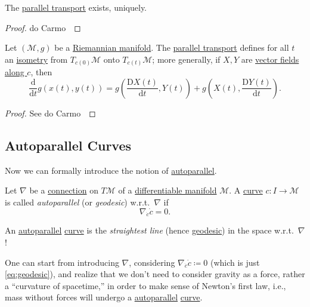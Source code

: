 \begin{proposition}
	The \hyperref[def:parallel-transport]{parallel transport} exists, uniquely.
\end{proposition}
\begin{proof}
	do Carmo~\cite[Proposition 2.6]{flaherty2013riemannian}
\end{proof}

\begin{proposition}
	Let \((\mathcal{M} , g)\) be a \hyperref[def:Riemannian-manifold]{Riemannian manifold}. The \hyperref[def:parallel-transport]{parallel transport} defines for all \(t\) an \hyperref[def:isometry]{isometry} from \(T_{c(0)} \mathcal{M} \) onto \(T_{c(t)} \mathcal{M} \); more generally, if \(X, Y\) are \hyperref[def:vector-field-along-curve]{vector fields along \(c\)}, then
	\[
		\frac{\mathrm{d}}{\mathrm{d}t} g(x(t), y(t))
		= g\left( \frac{\mathrm{D} X(t)}{\mathrm{d} t}, Y(t)\right) + g\left(X(t), \frac{\mathrm{D} Y(t)}{\mathrm{d} t} \right) .
	\]
\end{proposition}
\begin{proof}
	See do Carmo~\cite[Proposition 3.2]{flaherty2013riemannian}
\end{proof}

\subsection{Autoparallel Curves}
Now we can formally introduce the notion of \hyperref[def:autoparallel]{autoparallel}.

\begin{definition}[Autoparallel]\label{def:autoparallel}
	Let \(\nabla \) be a \hyperref[def:linear-connection]{connection} on \(T \mathcal{M} \) of a \hyperref[def:smooth-manifold]{differentiable manifold} \(\mathcal{M} \). A \hyperref[def:curve]{curve} \(c\colon I \to \mathcal{M} \) is called \emph{autoparallel} (or \emph{geodesic}) w.r.t.\ \(\nabla \) if
	\[
		\nabla _{\dot{c}}\dot{c} = 0.
	\]
\end{definition}

\begin{intuition}
	An \hyperref[def:autoparallel]{autoparallel} \hyperref[def:curve]{curve} is the \emph{straightest line} (hence \hyperref[def:geodesic]{geodesic}) in the space w.r.t.\ \(\nabla \)!
\end{intuition}

\begin{remark}
	One can start from introducing \(\nabla \), considering \(\nabla _{\dot{c} }\dot{c} \coloneqq 0 \) (which is just \autoref{eq:geodesic}), and realize that we don't need to consider gravity as a force, rather a ``curvature of spacetime,'' in order to make sense of Newton's first law, i.e., mass without forces will undergo a \hyperref[def:autoparallel]{autoparallel} \hyperref[def:curve]{curve}.
\end{remark}

